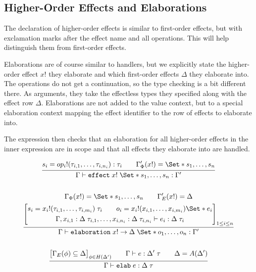\subsection{Higher-Order Effects and Elaborations}\label{ssec:specelabs}

The declaration of higher-order effects is similar to first-order effects, but with exclamation marks after the effect name and all operations. This will help distinguish them from first-order effects.

Elaborations are of course similar to handlers, but we explicitly state the higher-order effect $x!$ they elaborate and which first-order effects $\Delta$ they elaborate into. The operations do not get a continuation, so the type checking is a bit different there. As arguments, they take the effectless types they specified along with the effect row $\Delta$. Elaborations are not added to the value context, but to a special elaboration context mapping the effect identifier to the row of effects to elaborate into.
\\

The  expression then checks that an elaboration for all higher-order effects in the inner expression are in scope and that all effects they elaborate into are handled.
\\

\begin{gather*}
    \infer{
        \Gamma \vdash \kw{effect}\;x!\;\S{s_1, \dots, s_n}: \Gamma'
    }{
        s_i = op_i!(\tau_{i,1}, \dots, \tau_{i,n_i}): \tau_i
        \qquad
        \Gamma'_\Phi(x!) = \S{s_1, \dots, s_n}
    }
    \\\\
    \infer{
        \Gamma \vdash \elaboration\;x! \to \Delta\;\S{o_1, \dots, o_n} : \Gamma'
    }{
        \Gamma_\Phi(x!) = \S{s_1, \dots, s_n}
        \qquad
        \Gamma'_E(x!) = \Delta
        \\
        \left[
            \begin{gathered}
                s_i = x_i!(\tau_{i,1}, \dots, \tau_{i,m_i})\;\tau_i \qquad o_i = x_i!(x_{i,1}, \dots, x_{i,m_i}) \S{ e_i }
                \\
                \Gamma,x_{i,1}: \Delta\;\tau_{i,1},\dots,x_{i,n_i}: \Delta\;\tau_{i,n_i} \vdash 
                e_i : \Delta\;\tau_i
            \end{gathered}
        \right]_{1\leq i \leq n}
            }
    \\\\
    \infer{
        \Gamma \vdash \elab\;e : \Delta\;\tau
    }{
        \big[
            \Gamma_E(\phi) \subseteq \Delta
        \big]_{\phi \in H(\Delta')}
        \qquad
        \Gamma \vdash e : \Delta'\;\tau
        \qquad
        \Delta = A(\Delta')
    }
    \\\\
\end{gather*}

